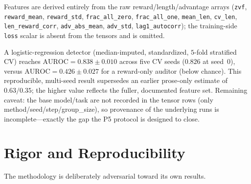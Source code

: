 \documentclass[11pt,a4paper]{article}
\begin{document}
Features are derived entirely from the raw reward/length/advantage arrays (\texttt{zvf}, \texttt{reward\_mean}, \texttt{reward\_std}, \texttt{frac\_all\_zero}, \texttt{frac\_all\_one}, \texttt{mean\_len}, \texttt{cv\_len}, \texttt{len\_reward\_corr}, \texttt{adv\_abs\_mean}, \texttt{adv\_std}, \texttt{lag1\_autocorr}); the training-side \texttt{loss} scalar is absent from the tensors and is omitted. 

A logistic-regression detector (median-imputed, standardized, $5$-fold stratified CV) reaches $\mathrm{AUROC}=0.838\pm0.010$ across five CV seeds ($0.826$ at seed~0), versus $\mathrm{AUROC}=0.426\pm0.027$ for a reward-only auditor (below chance). This reproducible, multi-seed result supersedes an earlier prose-only estimate of $0.63/0.35$; the higher value reflects the fuller, documented feature set. Remaining caveat: the base model/task are not recorded in the tensor rows (only method/seed/step/group\_size), so provenance of the underlying runs is incomplete---exactly the gap the P5 protocol is designed to close.

\section{Rigor and Reproducibility}
\label{sec:rigor}

The methodology is deliberately adversarial toward its own results.
\end{document}
